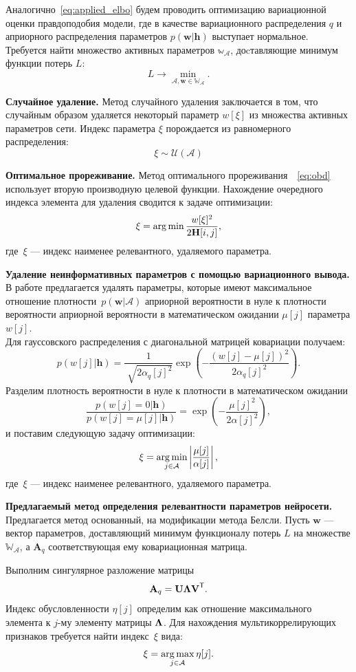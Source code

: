 Аналогично~\eqref{eq:applied_elbo} будем проводить оптимизацию вариационной оценки правдоподобия модели, где в качестве вариационного распределения $q$ и априорного распределения параметров $p(\mathbf{w}|\mathbf{h})$ выступает нормальное.
Требуется найти множество активных параметров $\mathbb{w_\mathcal{A}}$, доcтавляющие минимум функции потерь $L$:
$$
    L \to \min_{\mathcal{A}, \mathbf{w} \in \mathbb{W}_{\mathcal{A}}}.
$$


\textbf{Случайное удаление. }
Метод случайного удаления заключается в том, что случайным образом удаляется некоторый параметр $w[\xi]$ из множества активных параметров сети.  Индекс параметра $\xi$ порождается из равномерного распределения:
$$\xi \sim \mathcal{U}(\mathcal{A})$$

\textbf{Оптимальное прореживание. }
Метод оптимального прореживания~\cite{obd}~\eqref{eq:obd} использует вторую производную целевой функции.
Нахождение очередного индекса элемента для удаления сводится к задаче оптимизации:
\[
    \xi = \operatorname*{arg\,min} \frac{w[\xi]^2}{2\mathbf{H}[i,j]},
\]
где~$\xi$ --- индекс наименее релевантного, удаляемого параметра.

\textbf{Удаление неинформативных параметров с помощью вариационного вывода. }
В работе \cite{nips} предлагается удалять параметры, которые имеют максимальное отношение плотности~$p(\textbf{w}|\mathcal{A})$ априорной вероятности в нуле к плотности вероятности априорной вероятности в математическом ожидании $\mu[j]$ параметра $w[j]$.\\
Для гауссовского распределения с диагональной матрицей ковариации получаем:
$$p(w[j]|\mathbf{h}) = \frac{1}{\sqrt[]{2\alpha_q[j]^2}}\exp({-\frac{(w[j]-\mu[j])^2}{2\alpha_q[j]^2}}).$$
Разделим плотность вероятности в нуле к плотности в математическом ожидании
$$ \frac{p(w[j]=0|\mathbf{h})}{p(w[j]=\mu[j]|\mathbf{h})}= \exp({-\frac{\mu[j]^2}{2\alpha[j]^2}}),$$
и поставим следующую задачу оптимизации:
$$\xi = \operatorname*{arg\,min}_{j\in \mathcal{A}} \left|\frac{\mu[j]}{\alpha[j]}\right|,$$
где~$\xi$ --- индекс наименее релевантного, удаляемого параметра.

\textbf{Предлагаемый метод определения релевантности параметров нейросети. }
Предлагается метод основанный, на модификации метода Белсли. Пусть $\mathbf{w}$ --- вектор параметров, доставляющий минимум функционалу потерь $L$ на  множестве $\mathbb{W_\mathcal{A}}$, а $\mathbf{A}_q$ соответствующая ему ковариационная матрица.

Выполним сингулярное разложение матрицы
$$\textbf{A}_q = \textbf{U}{\bf\Lambda}\textbf{V}^\mathsf{T}.$$
Индекс обусловленности $\eta[j]$ определим как отношение максимального элемента к $j$-му элементу матрицы ${\bf\Lambda}$. Для нахождения мультикоррелирующих признаков требуется найти индекс~$\xi$ вида:
$$\xi = \operatorname*{arg\,max}_{j\in \mathcal{A}}{\eta[j]}. $$

